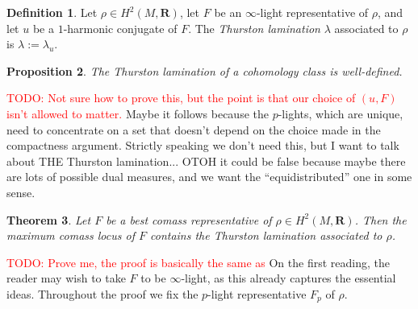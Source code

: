 \documentclass[reqno,11pt]{amsart}
\newcommand{\RR}{\mathbf{R}}
\newcommand{\dfn}[1]{\emph{#1}\index{#1}}
\newtheorem{theorem}{Theorem}[section]
\newtheorem{proposition}[theorem]{Proposition}
\theoremstyle{definition}
\newtheorem{definition}[theorem]{Definition}
\numberwithin{equation}{section}
\newcommand\todo[1]{\textcolor{red}{TODO: #1}}
\begin{document}
\begin{definition}
Let $\rho \in H^2(M, \RR)$, let $F$ be an $\infty$-light representative of $\rho$, and let $u$ be a $1$-harmonic conjugate of $F$.
The \dfn{Thurston lamination} $\lambda$ associated to $\rho$ is $\lambda := \lambda_u$.
\end{definition}

\begin{proposition}
The Thurston lamination of a cohomology class is well-defined.
\end{proposition}

\todo{Not sure how to prove this, but the point is that our choice of $(u, F)$ isn't allowed to matter.} Maybe it follows because the $p$-lights, which are unique, need to concentrate on a set that doesn't depend on the choice made in the compactness argument. Strictly speaking we don't need this, but I want to talk about THE Thurston lamination...
OTOH it could be false because maybe there are lots of possible dual measures, and we want the ``equidistributed'' one in some sense.

\begin{theorem}\label{MCL contains Thurston}
Let $F$ be a best comass representative of $\rho \in H^2(M, \RR)$.
Then the maximum comass locus of $F$ contains the Thurston lamination associated to $\rho$.
\end{theorem}

\todo{Prove me, the proof is basically the same as \cite[\S6.1, \S6.2]{daskalopoulos2020transverse}}
On the first reading, the reader may wish to take $F$ to be $\infty$-light, as this already captures the essential ideas.
Throughout the proof we fix the $p$-light representative $F_p$ of $\rho$.
\end{document}
